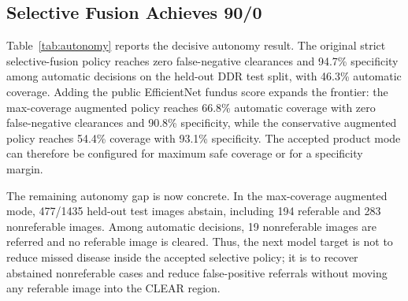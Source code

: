 \documentclass[journal]{IEEEtran}
\begin{document}
\subsection{Selective Fusion Achieves 90/0}
Table~\ref{tab:autonomy} reports the decisive autonomy result. The original strict selective-fusion policy reaches zero false-negative clearances and 94.7\% specificity among automatic decisions on the held-out DDR test split, with 46.3\% automatic coverage. Adding the public EfficientNet fundus score expands the frontier: the max-coverage augmented policy reaches 66.8\% automatic coverage with zero false-negative clearances and 90.8\% specificity, while the conservative augmented policy reaches 54.4\% coverage with 93.1\% specificity. The accepted product mode can therefore be configured for maximum safe coverage or for a specificity margin.

The remaining autonomy gap is now concrete. In the max-coverage augmented mode, 477/1435 held-out test images abstain, including 194 referable and 283 nonreferable images. Among automatic decisions, 19 nonreferable images are referred and no referable image is cleared. Thus, the next model target is not to reduce missed disease inside the accepted selective policy; it is to recover abstained nonreferable cases and reduce false-positive referrals without moving any referable image into the CLEAR region.
\end{document}
